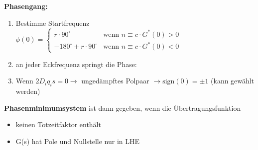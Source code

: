 \begin{tcolorbox}[colback=white!10!white,colframe=blue!50!white,title=Konstruktionsregeln]
    \tcblower
    \textbf{Phasengang:}
    \begin{enumerate}
        \item Bestimme Startfrequenz\\
        $\phi(0) = \begin{cases}
    r\cdot 90^\circ &\mbox{wenn } n \equiv c\cdot G^*(0)>0\\
    -180^\circ+r\cdot 90^\circ & \mbox{wenn } n \equiv c\cdot G^*(0)<0
        \end{cases} $
        \item an jeder Eckfrequenz springt die Phase:
        \item Wenn $2D_iq_is = 0 \rightarrow$ ungedämpftes Polpaar $\rightarrow\mbox{sign}(0) = \pm 1$ (kann gewählt werden)
    \end{enumerate}
        
\end{tcolorbox}
\begin{tcolorbox}[colback=white!10!white,colframe=green!30!black,title=Phasenminimumsystem]
\textbf{Phasenminimumsystem} ist dann gegeben, wenn die Übertragungsfunktion
\begin{itemize}
    \item keinen Totzeitfaktor enthält
    \item G(s) hat Pole und Nullstelle nur in LHE
\end{itemize}
\end{tcolorbox}
